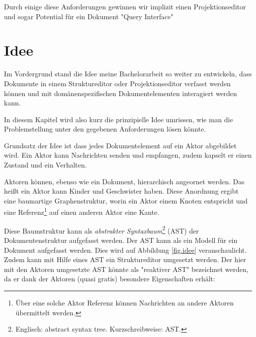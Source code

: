 Durch einige diese Anforderungen gewinnen wir implizit einen Projektionseditor und
sogar Potential für ein Dokument "Query Interface"

\section{Idee}


Im Vordergrund stand die Idee meine Bachelorarbeit so weiter zu entwickeln, dass Dokumente
in einem Struktureditor oder Projektionseditor verfasst werden können und mit domänenspezifischen Dokumentelementen
interagiert werden kann.

In diesem Kapitel wird also kurz die prinzipielle Idee umrissen,
wie man die Problemstellung unter den gegebenen Anforderungen lösen könnte.

Grundsatz der Idee ist dass jedes Dokumentelement auf ein Aktor abgebildet wird.
Ein Aktor kann Nachrichten senden und empfangen, zudem kapselt er einen Zustand und ein Verhalten.

Aktoren können, ebenso wie ein Dokument, hierarchisch angeornet werden.
Das heißt ein Aktor kann Kinder und Geschwister haben.
Diese Anordnung ergibt eine baumartige Graphenstruktur, worin ein Aktor
einem Knoten entspricht und eine Referenz\footnote{Über eine solche Aktor Referenz können Nachrichten an andere Aktoren übermittelt werden.} auf einen anderen Aktor eine Kante.

Diese Baumstruktur kann als \emph{abstrakter Syntaxbaum}\footnote{
Englisch: abstract syntax tree. Kurzschreibweise: AST.} (AST) der Dokumentenstruktur aufgefasst werden.
Der AST kann als ein Modell für ein Dokument aufgefasst werden.
Dies wird auf Abbildung \ref{fig.idee} veranschaulicht.
Zudem kann mit Hilfe eines AST ein Struktureditor umgesetzt werden.
Der hier mit den Aktoren umgesetzte AST könnte als "reaktiver AST" bezeichnet werden,
da er dank der Aktoren (quasi gratis) besondere Eigenschaften erhält:

